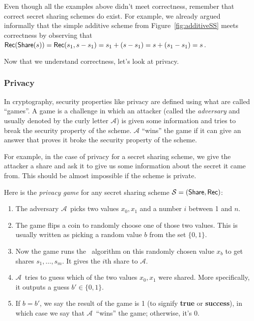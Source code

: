 \documentclass[12 pt]{article}
\def\A{\ensuremath{\mathcal{A}}}
\def\ss{\ensuremath{\mathcal{S}}}
\newcounter{example}[section]
\begin{document}
Even though all the examples above didn't meet correctness, remember that
correct secret sharing schemes do exist. For example, we already argued informally that 
the simple additive scheme from Figure~\ref{fig:additiveSS} meets correctness
by observing that $\mathsf{Rec}(\mathsf{Share}(s)) = \mathsf{Rec}(s_1, s-s_1) = s_1 + 
(s-s_1) = s + (s_1-s_1) = s$.

Now that we understand correctness, let's look at privacy.

\subsubsection{Privacy}

In cryptography, security properties like privacy are defined using what 
are called ``games''. A game is a challenge in which an attacker (called 
the \emph{adversary} and usually denoted by the curly letter $\mathcal{A}$) is given 
some information and tries to break the security property of the scheme. 
$\A$ ``wins'' the game if it can give an answer that proves it broke 
the security property of the scheme. 

For example, in the case of privacy for a secret sharing scheme, we give 
the attacker a share and ask it to give us some information about the 
secret it came from. This should be almost impossible if the scheme is 
private.

Here is the \emph{privacy game} for any secret sharing scheme $\ss = (\share, \rec)$:
\begin{enumerate}
    \item The adversary \A~picks two values $x_0, x_1$ and a number $i$ 
    between 1 and $n$.
    \item The game flips a coin to randomly choose one of those two values.
    This is usually written as picking a random value $b$ from the set 
    $\{0, 1\}$.
    \item Now the game runs the \share~algorithm on this randomly chosen 
    value $x_b$ to get shares $s_1, \ldots, s_m$. It gives the $i$th share
    to \A.
    \item \A~tries to guess which of the two values $x_0, x_1$ were shared.
    More specifically, it outputs a guess $b' \in \{0, 1\}$. 
    \item If $b=b'$, we say the result of the game is 1 (to signify 
    \textbf{true} or \textbf{success}), in which case we say that \A~``wins''
    the game; otherwise, it's 0.
\end{enumerate}
\end{document}
